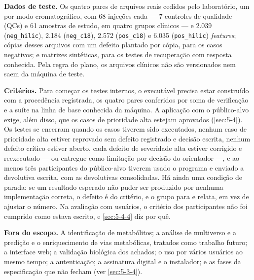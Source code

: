 \textbf{Dados de teste.} Os quatro pares de arquivos reais cedidos pelo laboratório, um por modo cromatográfico, com 68 injeções cada --- 7 controles de qualidade (QCs) e 61 amostras de estudo, em quatro grupos clínicos --- e 2.039 (\texttt{neg\_\allowbreak{}hilic}), 2.184 (\texttt{neg\_\allowbreak{}c18}), 2.572 (\texttt{pos\_\allowbreak{}c18}) e 6.035 (\texttt{pos\_\allowbreak{}hilic}) \textit{features}; cópias desses arquivos com um defeito plantado por cópia, para os casos negativos; e matrizes sintéticas, para os testes de recuperação com resposta conhecida. Pela regra do plano, os arquivos clínicos não são versionados nem saem da máquina de teste.


\textbf{Critérios.} Para começar os testes internos, o executável precisa estar construído com a procedência registrada, os quatro pares conferidos por soma de verificação e a suíte na linha de base conhecida da máquina. A aplicação com o público-alvo exige, além disso, que os casos de prioridade alta estejam aprovados (\ref{sec:5-4}). Os testes se encerram quando os casos tiverem sido executados, nenhum caso de prioridade alta estiver reprovado sem defeito registrado e decisão escrita, nenhum defeito crítico estiver aberto, cada defeito de severidade alta estiver corrigido e reexecutado --- ou entregue como limitação por decisão do orientador ---, e ao menos três participantes do público-alvo tiverem usado o programa e enviado a devolutiva escrita, com as devolutivas consolidadas. Há ainda uma condição de parada: se um resultado esperado não puder ser produzido por nenhuma implementação correta, o defeito é do critério, e o grupo para e relata, em vez de ajustar o número. Na avaliação com usuários, o critério dos participantes não foi cumprido como estava escrito, e \ref{sec:5-4-4} diz por quê.


\textbf{Fora do escopo.} A identificação de metabólitos; a análise de multiverso e a predição e o enriquecimento de vias metabólicas, tratados como trabalho futuro; a interface web; a validação biológica dos achados; o uso por vários usuários ao mesmo tempo; a autenticação; a assinatura digital e o instalador; e as fases da especificação que não fecham (ver \ref{sec:5-3-4}).

